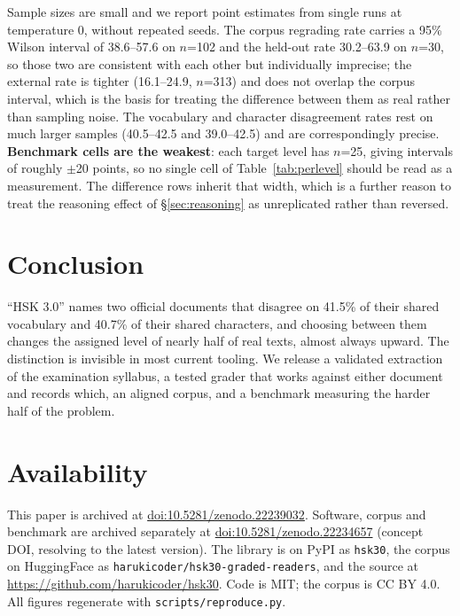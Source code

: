 \documentclass[11pt]{article}
\begin{document}
Sample sizes are small and we report point estimates from single runs at
temperature 0, without repeated seeds. The corpus regrading rate carries a 95\%
Wilson interval of 38.6--57.6 on $n$=102 and the held-out rate 30.2--63.9 on
$n$=30, so those two are consistent with each other but individually imprecise;
the external rate is tighter (16.1--24.9, $n$=313) and does not overlap the
corpus interval, which is the basis for treating the difference between them as
real rather than sampling noise. The vocabulary and character disagreement rates
rest on much larger samples (40.5--42.5 and 39.0--42.5) and are correspondingly
precise. \textbf{Benchmark cells are the weakest}: each target level has $n$=25,
giving intervals of roughly $\pm$20 points, so no single cell of
Table~\ref{tab:perlevel} should be read as a measurement. The difference rows
inherit that width, which is a further reason to treat the reasoning effect of
\S\ref{sec:reasoning} as unreplicated rather than reversed.

\section{Conclusion}
\label{sec:conclusion}

``HSK 3.0'' names two official documents that disagree on 41.5\% of their
shared vocabulary and 40.7\% of their shared characters, and choosing between
them changes the assigned level of nearly half of real texts, almost always
upward. The distinction is invisible in most current tooling. We release a
validated extraction of the examination syllabus, a tested grader that works
against either document and records which, an aligned corpus, and a benchmark
measuring the harder half of the problem.

\section*{Availability}

This paper is archived at \href{https://doi.org/10.5281/zenodo.22239032}{doi:10.5281/zenodo.22239032}.
Software, corpus and benchmark are archived separately at
\href{https://doi.org/10.5281/zenodo.22234657}{doi:10.5281/zenodo.22234657}
(concept DOI, resolving to the latest version). The library is on PyPI as
\texttt{hsk30}, the corpus on HuggingFace as
\texttt{harukicoder/hsk30-graded-readers}, and the source at
\url{https://github.com/harukicoder/hsk30}. Code is MIT; the corpus is CC BY
4.0. All figures regenerate with \texttt{scripts/reproduce.py}.
\end{document}

